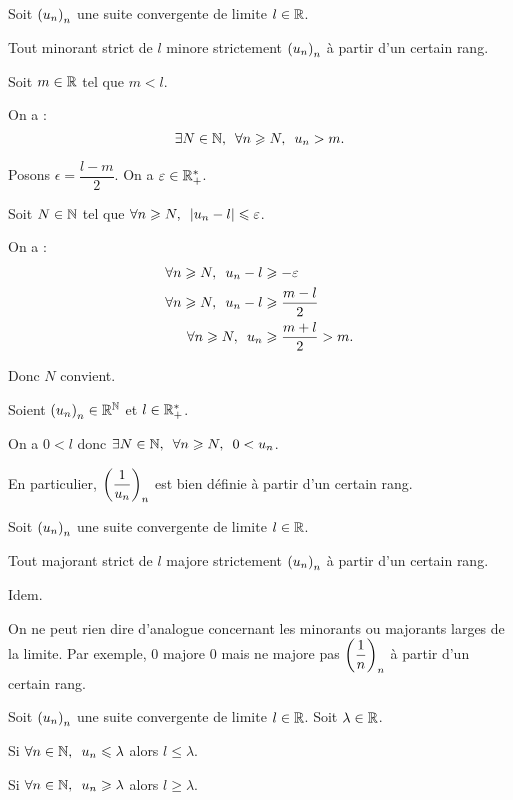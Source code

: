 \begin{prop}
Soit \(\left(u_n\right)_n\) une suite convergente de limite \(l\in\mathbb{R}\).

Tout minorant strict de \(l\) minore strictement \(\left(u_n\right)_n\) à partir d'un certain rang.
\end{prop}

\begin{dem}
Soit \(m\in\mathbb{R}\) tel que \(m<l\).

On a : \[\quantifs{\exists N\in\N;\forall n\geq N}u_n>m.\]

Posons \(\epsilon=\dfrac{l-m}{2}\). On a \(\varepsilon\in\mathbb{R}_+^*\).

Soit \(N\in\mathbb{N}\) tel que \(\quantifs{\forall n\geq N}\abs{u_n-l}\leq\epsilon\).

On a : \[\begin{aligned}
\quantifs{\forall n\geq N}u_n-l&\geq-\epsilon \\
\quantifs{\forall n\geq N}u_n-l&\geq\dfrac{m-l}{2} \\
\quantifs{\forall n\geq N}u_n&\geq\dfrac{m+l}{2}>m.
\end{aligned}\]

Donc \(N\) convient.
\end{dem}

\begin{ex}
Soient \(\left(u_n\right)_n\in\mathbb{R}^{\mathbb{N}}\) et \(l\in\mathbb{R}_+^*\).

On a \(0<l\) donc \(\quantifs{\exists N\in\N;\forall n\geq N}0<u_n\).

En particulier, \(\left(\dfrac{1}{u_n}\right)_n\) est bien définie à partir d'un certain rang.
\end{ex}

\begin{prop}
Soit \(\left(u_n\right)_n\) une suite convergente de limite \(l\in\mathbb{R}\).

Tout majorant strict de \(l\) majore strictement \(\left(u_n\right)_n\) à partir d'un certain rang.
\end{prop}

\begin{dem}
Idem.
\end{dem}

\begin{rem}
On ne peut rien dire d'analogue concernant les minorants ou majorants larges de la limite. Par exemple, \(0\) majore \(0\) mais ne majore pas \(\left(\dfrac{1}{n}\right)_n\) à partir d'un certain rang.
\end{rem}

\begin{prop}
Soit \(\left(u_n\right)_n\) une suite convergente de limite \(l\in\mathbb{R}\). Soit \(\lambda\in\mathbb{R}\).

Si \(\quantifs{\forall n\in\N}u_n\leq\lambda\) alors \(l\leq\lambda\).

Si \(\quantifs{\forall n\in\N}u_n\geq\lambda\) alors \(l\geq\lambda\).
\end{prop}


